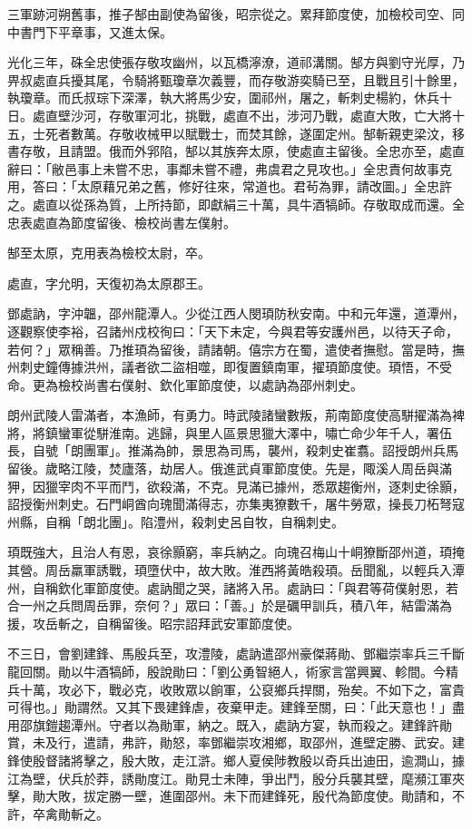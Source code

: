 \begin{pinyinscope}
 三軍跡河朔舊事，推子郜由副使為留後，昭宗從之。累拜節度使，加檢校司空、同中書門下平章事，又進太保。



 光化三年，硃全忠使張存敬攻幽州，以瓦橋濘潦，道祁溝關。郜方與劉守光厚，乃畀叔處直兵擾其尾，令騎將甄瓊章次義豐，而存敬游奕騎已至，且戰且引十餘里，執瓊章。而氏叔琮下深澤，執大將馬少安，圍祁州，屠之，斬刺史楊約，休兵十日。處直壁沙河，存敬軍河北，挑戰，處直不出，涉河乃戰，處直大敗，亡大將十五，士死者數萬。存敬收械甲以賦戰士，而焚其餘，遂圍定州。郜斬親吏梁汶，移書存敬，且請盟。俄而外郛陷，郜以其族奔太原，使處直主留後。全忠亦至，處直辭曰：「敝邑事上未嘗不忠，事鄰未嘗不禮，弗虞君之見攻也。」全忠責何故事克用，答曰：「太原藉兄弟之舊，修好往來，常道也。君茍為罪，請改圖。」全忠許之。處直以從孫為質，上所持節，即獻絹三十萬，具牛酒犒師。存敬取成而還。全忠表處直為節度留後、檢校尚書左僕射。



 郜至太原，克用表為檢校太尉，卒。



 處直，字允明，天復初為太原郡王。



 鄧處訥，字沖韞，邵州龍潭人。少從江西人閔頊防秋安南。中和元年還，道潭州，逐觀察使李裕，召諸州戍校徇曰：「天下未定，今與君等安護州邑，以待天子命，若何？」眾稱善。乃推頊為留後，請諸朝。僖宗方在蜀，遣使者撫慰。當是時，撫州刺史鐘傳據洪州，議者欲二盜相噬，即復置鎮南軍，擢頊節度使。頊悟，不受命。更為檢校尚書右僕射、欽化軍節度使，以處訥為邵州刺史。



 朗州武陵人雷滿者，本漁師，有勇力。時武陵諸蠻數叛，荊南節度使高駢擢滿為裨將，將鎮蠻軍從駢淮南。逃歸，與里人區景思獵大澤中，嘯亡命少年千人，署伍長，自號「朗團軍」。推滿為帥，景思為司馬，襲州，殺刺史崔翥。詔授朗州兵馬留後。歲略江陵，焚廬落，劫居人。俄進武貞軍節度使。先是，陬溪人周岳與滿狎，因獵宰肉不平而鬥，欲殺滿，不克。見滿已據州，悉眾趨衡州，逐刺史徐顥，詔授衡州刺史。石門峒酋向瑰聞滿得志，亦集夷獠數千，屠牛勞眾，操長刀柘弩寇州縣，自稱「朗北團」。陷澧州，殺刺史呂自牧，自稱刺史。



 頊既強大，且治人有恩，哀徐顥窮，率兵納之。向瑰召梅山十峒獠斷邵州道，頊掩其營。周岳羸軍誘戰，頊墮伏中，故大敗。淮西將黃皓殺頊。岳聞亂，以輕兵入潭州，自稱欽化軍節度使。處訥聞之哭，諸將入吊。處訥曰：「與君等荷僕射恩，若合一州之兵問周岳罪，奈何？」眾曰：「善。」於是礪甲訓兵，積八年，結雷滿為援，攻岳斬之，自稱留後。昭宗詔拜武安軍節度使。



 不三日，會劉建鋒、馬殷兵至，攻澧陵，處訥遣邵州豪傑蔣勛、鄧繼崇率兵三千斷龍回關。勛以牛酒犒師，殷說勛曰：「劉公勇智絕人，術家言當興翼、軫間。今精兵十萬，攻必下，戰必克，收敗眾以餉軍，公裒鄉兵捍關，殆矣。不如下之，富貴可得也。」勛謂然。又其下畏建鋒虐，夜棄甲走。建鋒至關，曰：「此天意也！」盡用邵旗鎧趨潭州。守者以為勛軍，納之。既入，處訥方宴，執而殺之。建鋒許勛賞，未及行，遣請，弗許，勛怒，率鄧繼崇攻湘鄉，取邵州，進壁定勝、武安。建鋒使殷督諸將擊之，殷大敗，走江滸。鄉人夏侯陟教殷以奇兵出迪田，逾澗山，據江為壁，伏兵於莽，誘勛度江。勛見士未陣，爭出鬥，殷分兵襲其壁，麾瀕江軍夾擊，勛大敗，拔定勝一壁，進圍邵州。未下而建鋒死，殷代為節度使。勛請和，不許，卒禽勛斬之。




\end{pinyinscope}
